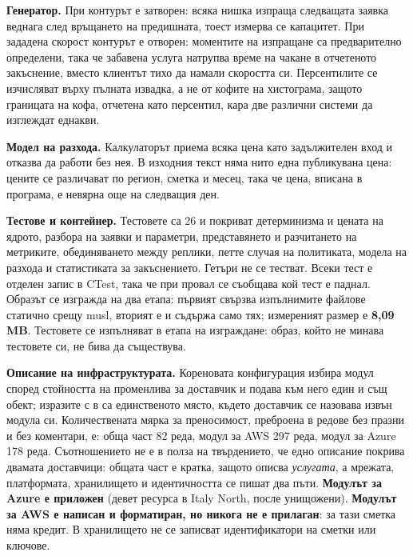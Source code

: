 \textbf{Генератор.} При  контурът е затворен: всяка нишка изпраща следващата заявка
веднага след връщането на предишната, тоест измерва се капацитет. При зададена скорост контурът е
отворен: моментите на изпращане са предварително определени, така че забавена услуга натрупва
време на чакане в отчетеното закъснение, вместо клиентът тихо да намали скоростта си. Персентилите
се изчисляват върху пълната извадка, а не от кофите на хистограма, защото границата на кофа,
отчетена като персентил, кара две различни системи да изглеждат еднакви.

\textbf{Модел на разхода.} Калкулаторът приема всяка цена като задължителен вход и отказва да
работи без нея. В изходния текст няма нито една публикувана цена: цените се различават по регион,
сметка и месец, така че цена, вписана в програма, е невярна още на следващия ден.

\textbf{Тестове и контейнер.} Тестовете са 26 и покриват детерминизма и цената на ядрото, разбора
на заявки и параметри, представянето и разчитането на метриките, обединяването между реплики,
петте случая на политиката, модела на разхода и статистиката за закъснението. Гетъри не се тестват.
Всеки тест е отделен запис в CTest, така че при провал се съобщава кой тест е паднал. Образът се
изгражда на два етапа: първият свързва изпълнимите файлове статично срещу musl, вторият е
 и съдържа само тях; измереният размер е \textbf{8{,}09 MB}. Тестовете се изпълняват
в етапа на изграждане: образ, който не минава тестовете си, не бива да съществува.

\textbf{Описание на инфраструктурата.} Кореновата конфигурация избира модул според стойността на
променлива за доставчик и подава към него един и същ обект; изразите с  в
 са единственото място, където доставчик се назовава извън модула си.
Количествената мярка за преносимост, преброена в редове без празни и без коментари, е: обща част
82 реда, модул за AWS 297 реда, модул за Azure 178 реда. Съотношението не е в полза на
твърдението, че едно описание покрива двамата доставчици: общата част е кратка, защото описва
\emph{услугата}, а мрежата, платформата, хранилището и идентичността се пишат два пъти.
\textbf{Модулът за Azure е приложен} (девет ресурса в Italy North, после унищожени).
\textbf{Модулът за AWS е написан и форматиран, но никога не е прилаган}: за тази сметка
няма кредит. В хранилището не се записват идентификатори на сметки или ключове.
